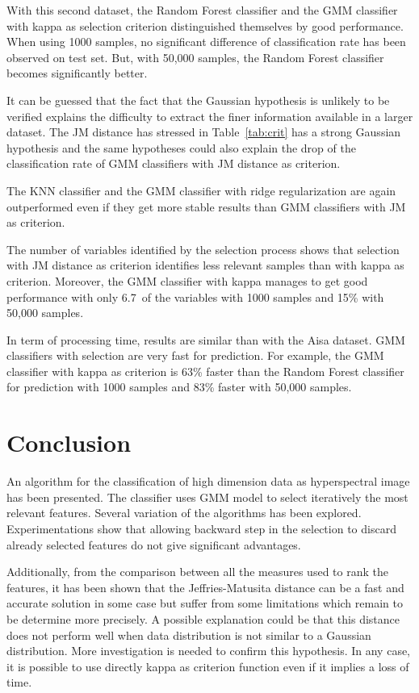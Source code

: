 \documentclass[journal]{IEEEtran}
\begin{document}
    With this second dataset, the Random Forest classifier and the GMM classifier with kappa as selection criterion distinguished themselves by good performance. When using 1000 samples, no significant difference of classification rate has been observed on test set. But, with 50,000 samples, the Random Forest classifier becomes significantly better.

    It can be guessed that the fact that the Gaussian hypothesis is unlikely to be verified explains the difficulty to extract the finer information available in a larger dataset. The JM distance has stressed in Table~\ref{tab:crit} has a strong Gaussian hypothesis and the same hypotheses could also explain the drop of the classification rate of GMM classifiers with JM distance as criterion.

    The KNN classifier and the GMM classifier with ridge regularization are again outperformed even if they get more stable results than GMM classifiers with JM as criterion.

    The number of variables identified by the selection process shows that selection with JM distance as criterion identifies less relevant samples than with kappa as criterion. Moreover, the GMM classifier with kappa manages to get good performance with only 6.7\ of the variables with 1000 samples and 15\% with 50,000 samples.

    In term of processing time, results are similar than with the Aisa dataset. GMM classifiers with selection are very fast for prediction. For example, the GMM classifier with kappa as criterion is 63\% faster than the Random Forest classifier for prediction with 1000 samples and 83\% faster with 50,000 samples.

\section{Conclusion}

An algorithm for the classification of high dimension data as hyperspectral image has been presented. The classifier uses GMM model to select iteratively the most relevant features. Several variation of the algorithms has been explored. Experimentations show that allowing backward step in the selection to discard already selected features do not give significant advantages.

Additionally, from the comparison between all the measures used to rank the features, it has been shown that the Jeffries-Matusita distance can be a fast and accurate solution in some case but suffer from some limitations which remain to be determine more precisely. A possible explanation could be that this distance does not perform well when data distribution is not similar to a Gaussian distribution. More investigation is needed to confirm this hypothesis. In any case, it is possible to use directly kappa as criterion function even if it implies a loss of time.
\end{document}
